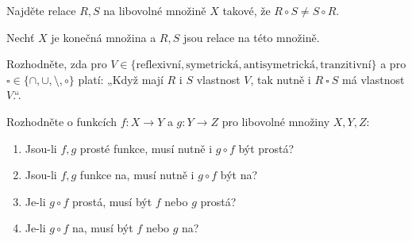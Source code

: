 \documentclass[10pt]{article}
\begin{document}
\begin{problem}
Najděte relace $R,S$ na libovolné množině $X$ takové, že $R \circ S \neq S \circ R$.
\end{problem}

\begin{problem}
Nechť $X$ je konečná množina a $R,S$ jsou relace na této množině. 

\noindent
Rozhodněte, zda pro $V \in \{\text{reflexivní}, \text{symetrická}, \text{antisymetrická},\text{tranzitivní}\}$ a pro $\square \in \{\cap,\cup,\setminus,\circ\}$ platí: „Když mají $R$ i $S$ vlastnost $V$, tak nutně i $R \ \square \ S$ má vlastnost $V$.“.
\end{problem}

\begin{problem}
Rozhodněte o funkcích $f: X \rightarrow Y$ a $g: Y \rightarrow Z$ pro libovolné množiny $X,Y,Z$:
\begin{enumerate}[label=(\alph*)]
    \item Jsou-li $f,g$ prosté funkce, musí nutně i $g \circ f$ být prostá?
    \item Jsou-li $f,g$ funkce na, musí nutně i $g \circ f$ být na?
    \item Je-li $g \circ f$ prostá, musí být $f$ nebo $g$ prostá?
    \item Je-li $g \circ f$ na, musí být $f$ nebo $g$ na?
\end{enumerate}
\end{problem}
\end{document}
